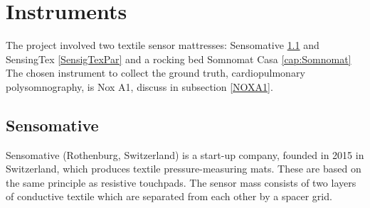 \section{Instruments}
The project involved two textile sensor mattresses: Sensomative \ref{SensomativePar} and SensingTex \ref{SensigTexPar} and a rocking bed Somnomat Casa \ref{cap:Somnomat}
The chosen instrument to collect the ground truth, cardiopulmonary polysomnography, is Nox A1, discuss in subsection \ref{NOXA1}.


\subsection{Sensomative}\label{SensomativePar}
Sensomative (Rothenburg, Switzerland)\cite{sensomativeUrl} is a start-up company, founded in 2015 in Switzerland, which produces textile pressure-measuring mats. These are based on the same principle as resistive touchpads. The sensor mass
consists of two layers of conductive textile which are separated from each other by a spacer grid. 

